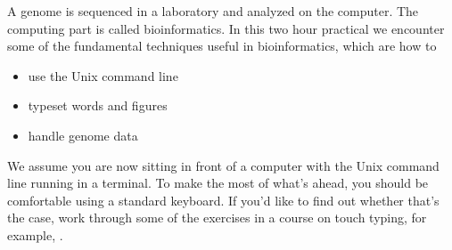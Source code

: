 A genome is sequenced in a laboratory and analyzed on the
computer. The computing part is called bioinformatics. In this two
hour practical we encounter some of the fundamental techniques useful
in bioinformatics, which are how to
\begin{itemize}
\item use the Unix command line
\item typeset words and figures
\item handle genome data
\end{itemize}
We assume you are now sitting in front of a computer with the Unix
command line running in a terminal. To make the most of what's ahead,
you should be comfortable using a standard keyboard. If you'd like to
find out whether that's the case, work through some of the exercises
in a course on touch typing, for example, .
